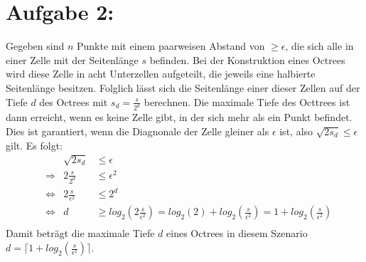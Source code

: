 \section*{Aufgabe 2: }
Gegeben sind $n$ Punkte mit einem paarweisen Abstand von $\geq \epsilon$, die sich alle in einer Zelle mit der Seitenlänge $s$ befinden. Bei der Konstruktion eines Octrees wird diese Zelle in acht Unterzellen aufgeteilt, die jeweils eine halbierte Seitenlänge besitzen. Folglich lässt sich die Seitenlänge einer dieser Zellen auf der Tiefe $d$ des Octrees mit $s_d = \frac{s}{2^d}$ berechnen. Die maximale Tiefe des Octtrees ist dann erreicht, wenn es keine Zelle gibt, in der sich mehr als ein Punkt befindet. Dies ist garantiert, wenn die Diagnonale der Zelle gleiner als $\epsilon$ ist, also $\sqrt{2 s_d} \leq \epsilon$ gilt. Es folgt:
\begin{align*}
  && \sqrt{2 s_d} & \leq \epsilon\\
  &\Rightarrow & 2\frac{s}{2^d} & \leq \epsilon^2\\
  &\Leftrightarrow & 2\frac{s}{\epsilon^2} & \leq 2^d\\
  &\Leftrightarrow & d & \geq log_2(2\frac{s}{\epsilon^2}) = log_2(2) + log_2(\frac{s}{\epsilon^2}) = 1 + log_2(\frac{s}{\epsilon^2})\\
\end{align*}
Damit beträgt die maximale Tiefe $d$ eines Octrees in diesem Szenario $d = \lceil 1 + log_2(\frac{s}{\epsilon^2}) \rceil$.